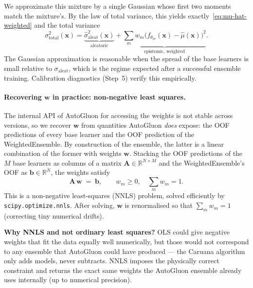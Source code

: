 \documentclass[11pt,a4paper]{article}
\begin{document}
We approximate this mixture by a single Gaussian whose first two moments match the mixture's. By the law of total variance, this yields exactly~\eqref{eq:mu-hat-weighted} and the total variance
\[
\sigma^2_{\text{total}}(\bm x) =
\underbrace{\hat\sigma^2_{\text{aleat}}(\bm x)}_{\text{aleatoric}}
+
\underbrace{\sum_m w_m \big(f_{\theta_m}(\bm x) - \hat\mu(\bm x)\big)^2}_{\text{epistemic, weighted}}.
\]
The Gaussian approximation is reasonable when the spread of the base learners is small relative to $\sigma_{\text{aleat}}$, which is the regime expected after a successful ensemble training. Calibration diagnostics (Step~5) verify this empirically.

\paragraph{Recovering $\bm w$ in practice: non-negative least squares.} The internal API of AutoGluon for accessing the weights is not stable across versions, so we recover $\bm w$ from quantities AutoGluon \emph{does} expose: the OOF predictions of every base learner and the OOF prediction of the WeightedEnsemble. By construction of the ensemble, the latter is a linear combination of the former with weights $\bm w$. Stacking the OOF predictions of the $M$ base learners as columns of a matrix $\mathbf{A} \in \mathbb{R}^{N \times M}$ and the WeightedEnsemble's OOF as $\bm b \in \mathbb{R}^N$, the weights satisfy
\begin{equation}
\mathbf{A} \, \bm w \;=\; \bm b, \qquad w_m \geq 0, \quad \sum_m w_m = 1.
\label{eq:nnls}
\end{equation}
This is a non-negative least-squares (NNLS) problem, solved efficiently by \texttt{scipy.optimize.nnls}. After solving, $\bm w$ is renormalised so that $\sum_m w_m = 1$ (correcting tiny numerical drifts).

\begin{intuitionbox}
\textbf{Why NNLS and not ordinary least squares?} OLS could give negative weights that fit the data equally well numerically, but those would not correspond to any ensemble that AutoGluon could have produced --- the Caruana algorithm only adds models, never subtracts. NNLS imposes the physically correct constraint and returns the exact same weights the AutoGluon ensemble already uses internally (up to numerical precision).
\end{intuitionbox}
\end{document}
